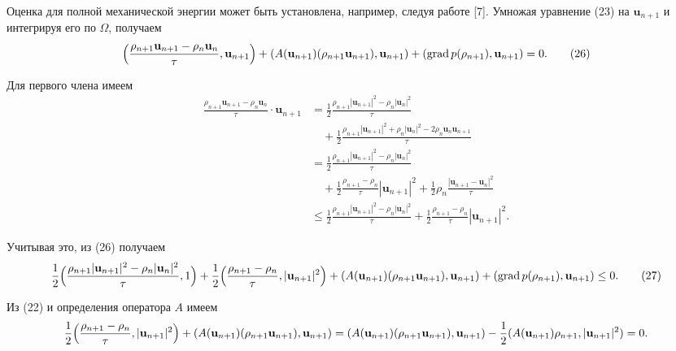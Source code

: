 \documentclass[10pt,twocolumn]{article}
\begin{document}
Оценка для полной механической энергии может быть установлена, например, следуя работе [7]. Умножая уравнение (23) на \(\mathbf{u}_{n + 1}\) и интегрируя его по \(\Omega\), получаем
\begin{equation}
\Bigl(\frac{\rho_{n + 1}\mathbf{u}_{n + 1} - \rho_{n}\mathbf{u}_{n}}{\tau}, \mathbf{u}_{n + 1}\Bigr) + (A(\mathbf{u}_{n + 1})(\rho_{n + 1}\mathbf{u}_{n + 1}), \mathbf{u}_{n + 1}) + (\operatorname{grad}p(\rho_{n + 1}), \mathbf{u}_{n + 1}) = 0. \tag{26}
\end{equation}

Для первого члена имеем
\[
\begin{aligned}
\frac{\rho_{n + 1}\mathbf{u}_{n + 1} - \rho_{n}\mathbf{u}_{n}}{\tau} \cdot \mathbf{u}_{n + 1} &= \frac{1}{2}\frac{\rho_{n + 1}|\mathbf{u}_{n + 1}|^2 - \rho_{n}|\mathbf{u}_{n}|^2}{\tau} \\
&\quad + \frac{1}{2}\frac{\rho_{n + 1}|\mathbf{u}_{n + 1}|^2 + \rho_{n}|\mathbf{u}_{n}|^2 - 2\rho_{n}\mathbf{u}_{n}\mathbf{u}_{n + 1}}{\tau} \\
&= \frac{1}{2}\frac{\rho_{n + 1}|\mathbf{u}_{n + 1}|^2 - \rho_{n}|\mathbf{u}_{n}|^2}{\tau} \\
&\quad + \frac{1}{2}\frac{\rho_{n + 1} - \rho_{n}}{\tau}|\mathbf{u}_{n + 1}|^2 + \frac{1}{2}\rho_{n}\frac{|\mathbf{u}_{n + 1} - \mathbf{u}_{n}|^2}{\tau} \\
&\leq \frac{1}{2}\frac{\rho_{n + 1}|\mathbf{u}_{n + 1}|^2 - \rho_{n}|\mathbf{u}_{n}|^2}{\tau} + \frac{1}{2}\frac{\rho_{n + 1} - \rho_{n}}{\tau}|\mathbf{u}_{n + 1}|^2.
\end{aligned}
\]

Учитывая это, из (26) получаем
\begin{equation}
\frac{1}{2}\Bigl(\frac{\rho_{n + 1}|\mathbf{u}_{n + 1}|^2 - \rho_{n}|\mathbf{u}_{n}|^2}{\tau}, 1\Bigr) + \frac{1}{2}\Bigl(\frac{\rho_{n + 1} - \rho_{n}}{\tau}, |\mathbf{u}_{n + 1}|^2\Bigr) + (A(\mathbf{u}_{n + 1})(\rho_{n + 1}\mathbf{u}_{n + 1}), \mathbf{u}_{n + 1}) + (\operatorname{grad}p(\rho_{n + 1}), \mathbf{u}_{n + 1}) \leq 0. \tag{27}
\end{equation}

Из (22) и определения оператора \(A\) имеем
\[
\frac{1}{2}\Bigl(\frac{\rho_{n + 1} - \rho_{n}}{\tau}, |\mathbf{u}_{n + 1}|^2\Bigr) + (A(\mathbf{u}_{n + 1})(\rho_{n + 1}\mathbf{u}_{n + 1}), \mathbf{u}_{n + 1}) = (A(\mathbf{u}_{n + 1})(\rho_{n + 1}\mathbf{u}_{n + 1}), \mathbf{u}_{n + 1}) - \frac{1}{2}(A(\mathbf{u}_{n + 1})\rho_{n + 1}, |\mathbf{u}_{n + 1}|^2) = 0.
\]
\end{document}
